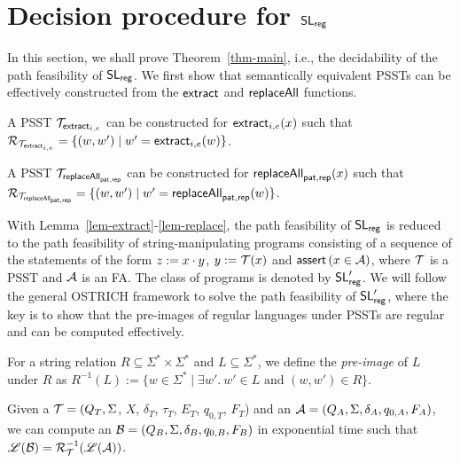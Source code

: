 
\section{Decision procedure for $\mathsf{SL}_{\sf reg}$} \label{sec:decision}

In this section, we shall prove Theorem~\ref{thm-main}, i.e., the decidability of the path feasibility of $\mathsf{SL}_{\sf reg}$. 
%
We first show that semantically equivalent PSSTs can be effectively constructed from the $\mathsf{extract}$ and $\mathsf{replaceAll}$ functions. 

\begin{lemma}\label{lem-extract}
A PSST $\mathcal{T}_{\mathsf{extract}_{i,e}}$ can be constructed for $\mathsf{extract}_{i,e}(x)$ such that $\mathcal{R}_{\mathcal{T}_{\mathsf{extract}_{i,e}}} = \{(w, w') \mid w'= \mathsf{extract}_{i,e}(w)\}$.
\end{lemma}

\begin{lemma}\label{lem-replace}
A PSST $\mathcal{T}_{\mathsf{replaceAll}_{\mathsf{pat}, \mathsf{rep}}}$ can be constructed for $\mathsf{replaceAll}_{\mathsf{pat}, \mathsf{rep}}(x)$ such that $\mathcal{R}_{\mathcal{T}_{\mathsf{replaceAll}_{\mathsf{pat}, \mathsf{rep}}}} = \{(w, w') \mid w'= \mathsf{replaceAll}_{\mathsf{pat}, \mathsf{rep}}(w)\}$.
\end{lemma}

With Lemma~\ref{lem-extract}-\ref{lem-replace}, the path feasibility of $\mathsf{SL}_{\sf reg}$ is reduced to the path feasibility of string-manipulating programs consisting of  a sequence of the statements of the form $z:=x \cdot y$, $y:=\mathcal{T}(x)$ and $\textsf{assert}\left(x \in \mathcal{A}\right)$, where $\mathcal{T}$ is a PSST and $\mathcal{A}$ is an FA.  The class of programs is denoted by $\mathsf{SL}'_{\sf reg}$. We will  follow %
the general OSTRICH framework \cite{CCH+18,CHL+19} to solve the path feasibility of $\mathsf{SL}'_{\sf reg}$, where the key is to show that the pre-images of regular languages  under PSSTs  are regular and can be computed effectively.

\begin{definition}
For a string relation $R \subseteq \Sigma^* \times \Sigma^*$ and $L \subseteq \Sigma^*$, we define the \emph{pre-image} of $L$ under $R$ as $R^{-1}(L):=\{w \in \Sigma^* \mid \exists w'.\ w' \in L \mbox{ and } (w, w') \in R\}$. 
\end{definition}
 
\begin{lemma}
  \label{lem:psst_preimage}
  Given a \PSST{} $\mathcal{T} = (Q_T, \Sigma$, $X$, $\delta_T$, $\tau_T$, $E_T$,  $q_{0, T}$, $F_T$) and an \FA{} $\mathcal{A}
  = (Q_A, \Sigma, \delta_A, q_{0, A}, F_A)$, we can compute an \FA{} $\mathcal{B} = (Q_B,
  \Sigma, \delta_B, q_{0, B}, F_B)$ in exponential time  such that $\mathscr{L}(\mathcal{B}) = \mathcal{R}^{-1}_{\mathcal{T}}(\mathscr{L}(\mathcal{A}))$.
\end{lemma}

